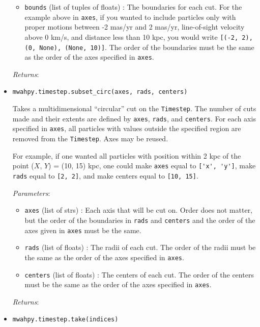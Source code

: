 \documentclass{article}
\begin{document}
\begin{itemize}
\begin{itemize}
\item \verb!bounds! (list of tuples of floats) : The boundaries for each cut. For the example above in \verb!axes!, if you wanted to include particles only with proper motions between -2 mas/yr and 2 mas/yr, line-of-sight velocity above 0 km/s, and distance less than 10 kpc, you would write \verb![(-2, 2), (0, None), (None, 10)]!. The order of the boundaries must be the same as the order of the axes specified in \verb!axes!.

\end{itemize}

\textit{Returns}: 



\item \verb!mwahpy.timestep.subset_circ(axes, rads, centers)!

Takes a multidimensional ``circular'' cut on the \verb!Timestep!. The number of cuts made and their extents are defined by \verb!axes!, \verb!rads!, and \verb!centers!. For each axis specified in \verb!axes!, all particles with values outside the specified region are removed from the \verb!Timestep!. Axes may be reused.

For example, if one wanted all particles with position within 2 kpc of the point ($X$, $Y$) = (10, 15) kpc, one could make \verb!axes! equal to \verb!['x', 'y']!, make \verb!rads! equal to \verb![2, 2]!, and make centers equal to \verb![10, 15]!.

\textit{Parameters}: \begin{itemize}

\item \verb!axes! (list of strs) : Each axis that will be cut on. Order does not matter, but the order of the boundaries in \verb!rads! and \verb!centers! and the order of the axes given in \verb!axes! must be the same.

\item \verb!rads! (list of floats) : The radii of each cut. The order of the radii must be the same as the order of the axes specified in \verb!axes!.

\item \verb!centers! (list of floats) : The centers of each cut. The order of the centers must be the same as the order of the axes specified in \verb!axes!.

\end{itemize}

\textit{Returns}: 



\item \verb!mwahpy.timestep.take(indices)!


\end{itemize}
\end{document}
